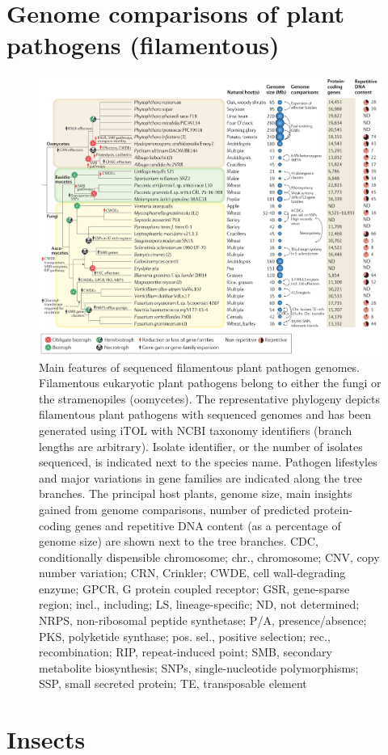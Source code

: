 \documentclass[10pt,dvipsnames,ignorenonframetext,aspectratio=169]{beamer}
\begin{document}
\hypertarget{genome-comparisons-of-plant-pathogens-filamentous}{%
\section{Genome comparisons of plant pathogens
(filamentous)}\label{genome-comparisons-of-plant-pathogens-filamentous}}

\begin{frame}{}
\protect\hypertarget{section-20}{}
\begin{figure}
\includegraphics[width=0.4\linewidth]{../images/genome_comparison_pathogenic_fungi} \caption{Main features of sequenced filamentous plant pathogen genomes. Filamentous eukaryotic plant pathogens belong to either the fungi or the stramenopiles (oomycetes). The representative phylogeny depicts filamentous plant pathogens with sequenced genomes and has been generated using iTOL with NCBI taxonomy identifiers (branch lengths are arbitrary). Isolate identifier, or the number of isolates sequenced, is indicated next to the species name. Pathogen lifestyles and major variations in gene families are indicated along the tree branches. The principal host plants, genome size, main insights gained from genome comparisons, number of predicted protein-coding genes and repetitive DNA content (as a percentage of genome size) are shown next to the tree branches. CDC, conditionally dispensible chromosome; chr., chromosome; CNV, copy number variation; CRN, Crinkler; CWDE, cell wall-degrading enzyme; GPCR, G protein coupled receptor; GSR, gene-sparse region; incl., including; LS, lineage-specific; ND, not determined; NRPS, non-ribosomal peptide synthetase; P/A, presence/absence; PKS, polyketide synthase; pos. sel., positive selection; rec., recombination; RIP, repeat-induced point; SMB, secondary metabolite biosynthesis; SNPs, single-nucleotide polymorphisms; SSP, small secreted protein; TE, transposable element}\label{fig:pathogenic-fungi-genome-compare}
\end{figure}
\end{frame}

\hypertarget{insects}{%
\section{Insects}\label{insects}}
\end{document}

